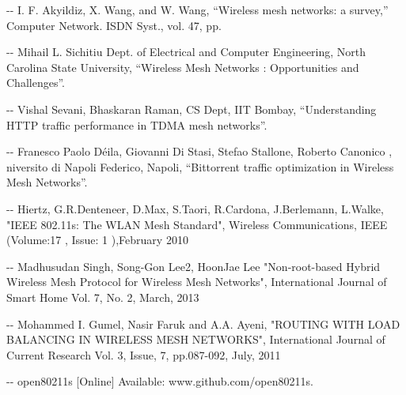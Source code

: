 \documentclass[12pt]{article}
\makeatletter
\newenvironment{indentation}[3]%
	{\par\setlength{\parindent}{#3}
	\setlength{\leftmargin}{#1}       \setlength{\rightmargin}{#1}%
	\advance\linewidth -\leftmargin       \advance\linewidth -\rightmargin%
	\advance\@totalleftmargin\leftmargin  \@setpar{{\@@par}}%
	\parshape 1\@totalleftmargin \linewidth\ignorespaces}{\par}%
\makeatother
\begin{document}
\begin{indentation}{0pt}{0pt}{0pt}
[1] I. F. Akyildiz, X. Wang, and W. Wang, “Wireless mesh networks: a survey,” Computer Network. ISDN Syst., vol. 47, pp.
\end{indentation}

\vspace{1cm}

\begin{indentation}{0pt}{0pt}{0pt}
[2] Mihail L. Sichitiu Dept. of  Electrical and Computer Engineering, North Carolina State 
University, “Wireless Mesh Networks : Opportunities and Challenges”.
\end{indentation}

\vspace{1cm} 

\begin{indentation}{0pt}{0pt}{0pt}
[3] Vishal Sevani, Bhaskaran Raman, CS Dept, IIT Bombay, “Understanding HTTP traffic performance in TDMA mesh networks”.
\end{indentation}

\vspace{1cm}

\begin{indentation}{0pt}{0pt}{0pt}
[4] Franesco Paolo Déila, Giovanni Di Stasi, Stefao Stallone, Roberto Canonico , niversito di Napoli Federico, Napoli, “Bittorrent traffic optimization in Wireless Mesh Networks”.
\end{indentation}

\vspace{1cm}

\begin{indentation}{0pt}{0pt}{0pt}
[5] Hiertz, G.R.Denteneer, D.Max, S.Taori, R.Cardona, J.Berlemann, L.Walke, "IEEE 802.11s: The WLAN Mesh Standard", Wireless Communications, IEEE  (Volume:17 ,  Issue: 1 ),February 2010
\end{indentation}

\vspace{1cm}

\begin{indentation}{0pt}{0pt}{0pt}
[6] Madhusudan Singh, Song-Gon Lee2, HoonJae Lee "Non-root-based Hybrid Wireless Mesh Protocol for Wireless Mesh Networks", International Journal of Smart Home Vol. 7, No. 2, March, 2013
\end{indentation}

\vspace{1cm}

\begin{indentation}{0pt}{0pt}{0pt}
[7] Mohammed I. Gumel, Nasir Faruk and A.A. Ayeni, "ROUTING WITH LOAD BALANCING IN WIRELESS MESH NETWORKS", International Journal of Current Research Vol. 3, Issue, 7, pp.087-092, July, 2011
\end{indentation}

\vspace{1cm}

\begin{indentation}{0pt}{0pt}{0pt}
[8] open80211s [Online] Available: www.github.com/open80211s.
\end{indentation}
\end{document}
